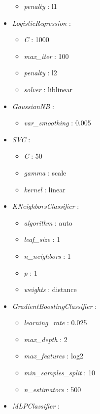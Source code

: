 \documentclass{article}
\begin{document}
\begin{footnotesize}
\begin{multicols}{2}
\begin{itemize}
\begin{itemize}
        \item \textit{penalty} : l1
    \end{itemize}
    \item \textit{LogisticRegression} :
    \begin{itemize}
        \item \textit{C} : 1000
        \item \textit{max\_iter} : 100
        \item \textit{penalty} : l2
        \item \textit{solver} : liblinear
    \end{itemize}
    \item \textit{GaussianNB} :
    \begin{itemize}
        \item \textit{var\_smoothing} : 0.005
    \end{itemize}
    \item \textit{SVC} :
    \begin{itemize}
        \item \textit{C} : 50
        \item \textit{gamma} : scale
        \item \textit{kernel} : linear
    \end{itemize}
    \item \textit{KNeighborsClassifier} :
    \begin{itemize}
        \item \textit{algorithm} : auto
        \item \textit{leaf\_size} : 1
        \item \textit{n\_neighbors} : 1
        \item \textit{p} : 1
        \item \textit{weights} : distance
    \end{itemize}
    \item \textit{GradientBoostingClassifier} :
    \begin{itemize}
        \item \textit{learning\_rate} : 0.025
        \item \textit{max\_depth} : 2
        \item \textit{max\_features} : log2
        \item \textit{min\_samples\_split} : 10
        \item \textit{n\_estimators} : 500
    \end{itemize}
    \item \textit{MLPClassifier} :

\end{itemize}
\end{multicols}
\end{footnotesize}
\end{document}
